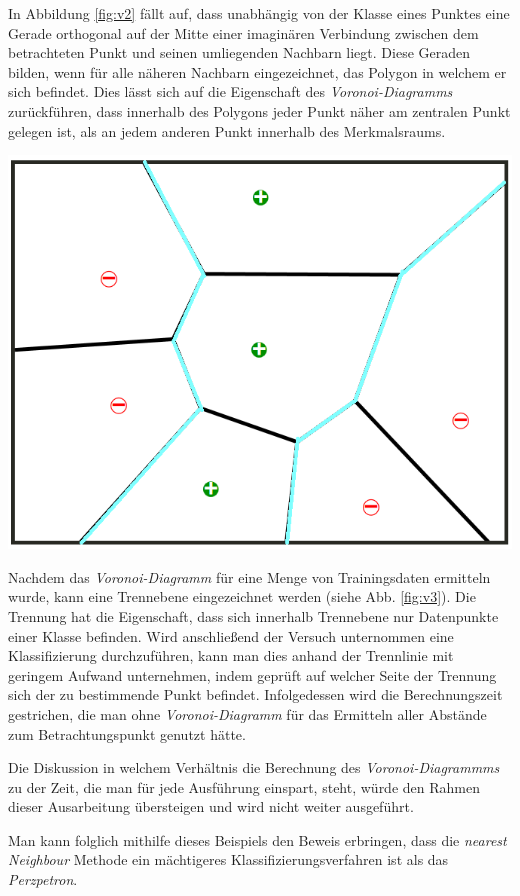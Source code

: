 \documentclass[fontsize=11pt]{scrartcl}
\newenvironment{Figure}
  {\par\medskip\noindent\minipage{\linewidth}}
  {\endminipage\par\medskip}
\begin{document}
            In Abbildung \ref{fig:v2} fällt auf, dass unabhängig von der Klasse eines Punktes eine Gerade orthogonal auf der Mitte einer imaginären Verbindung zwischen dem betrachteten Punkt und seinen umliegenden Nachbarn liegt. Diese Geraden bilden, wenn für alle näheren Nachbarn eingezeichnet, das Polygon in welchem er sich befindet. Dies lässt sich auf die Eigenschaft des \emph{Voronoi-Diagramms} zurückführen, dass innerhalb des Polygons jeder Punkt näher am zentralen Punkt gelegen ist, als an jedem anderen Punkt innerhalb des Merkmalsraums.
            
            \begin{Figure}
                \centering
                \includegraphics[width=.4\linewidth]{vor3.png}
            \end{Figure}

            Nachdem das \emph{Voronoi-Diagramm} für eine Menge von Trainingsdaten ermitteln wurde, kann eine Trennebene eingezeichnet werden (siehe Abb. \ref{fig:v3}). Die Trennung hat die Eigenschaft, dass sich innerhalb Trennebene nur Datenpunkte einer Klasse befinden. Wird anschließend der Versuch unternommen eine Klassifizierung durchzuführen, kann man dies anhand der Trennlinie mit geringem Aufwand unternehmen, indem geprüft auf welcher Seite der Trennung sich der zu bestimmende Punkt befindet. Infolgedessen wird die Berechnungszeit gestrichen, die man ohne \emph{Voronoi-Diagramm} für das Ermitteln aller Abstände zum Betrachtungspunkt genutzt hätte.\par
            Die Diskussion in welchem Verhältnis die Berechnung des \emph{Voronoi-Diagrammms} zu der Zeit, die man für jede Ausführung einspart, steht, würde den Rahmen dieser Ausarbeitung übersteigen und wird nicht weiter ausgeführt.\par
            Man kann folglich mithilfe dieses Beispiels den Beweis erbringen, dass die \emph{nearest Neighbour} Methode ein mächtigeres Klassifizierungsverfahren ist als das \emph{Perzpetron}.
            
\end{document}
